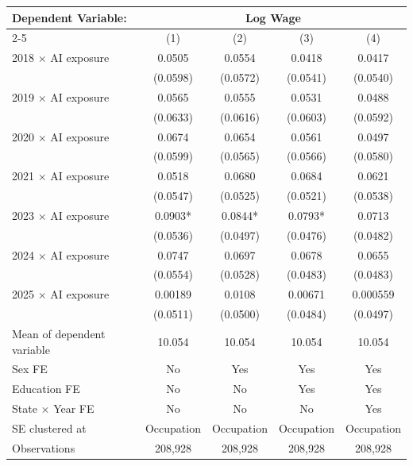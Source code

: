 \def\sym#1{\ifmmode^{#1}\else\(^{#1}\)\fi}
\begin{tabular}{l*{4}{c}}
\toprule
Dependent Variable: & \multicolumn{4}{c}{Log Wage} \\
\cmidrule(lr){2-5}
 & (1) & (2) & (3) & (4) \\
\midrule
2018 $\times$ AI exposure&      0.0505   &      0.0554   &      0.0418   &      0.0417   \\
            &    (0.0598)   &    (0.0572)   &    (0.0541)   &    (0.0540)   \\
2019 $\times$ AI exposure&      0.0565   &      0.0555   &      0.0531   &      0.0488   \\
            &    (0.0633)   &    (0.0616)   &    (0.0603)   &    (0.0592)   \\
2020 $\times$ AI exposure&      0.0674   &      0.0654   &      0.0561   &      0.0497   \\
            &    (0.0599)   &    (0.0565)   &    (0.0566)   &    (0.0580)   \\
2021 $\times$ AI exposure&      0.0518   &      0.0680   &      0.0684   &      0.0621   \\
            &    (0.0547)   &    (0.0525)   &    (0.0521)   &    (0.0538)   \\
2023 $\times$ AI exposure&      0.0903*  &      0.0844*  &      0.0793*  &      0.0713   \\
            &    (0.0536)   &    (0.0497)   &    (0.0476)   &    (0.0482)   \\
2024 $\times$ AI exposure&      0.0747   &      0.0697   &      0.0678   &      0.0655   \\
            &    (0.0554)   &    (0.0528)   &    (0.0483)   &    (0.0483)   \\
2025 $\times$ AI exposure&     0.00189   &      0.0108   &     0.00671   &    0.000559   \\
            &    (0.0511)   &    (0.0500)   &    (0.0484)   &    (0.0497)   \\
\midrule
Mean of dependent variable&      10.054   &      10.054   &      10.054   &      10.054   \\
Sex FE      &          No   &         Yes   &         Yes   &         Yes   \\
Education FE&          No   &          No   &         Yes   &         Yes   \\
State $\times$ Year FE&          No   &          No   &          No   &         Yes   \\
SE clustered at&  Occupation   &  Occupation   &  Occupation   &  Occupation   \\
Observations&     208,928   &     208,928   &     208,928   &     208,928   \\
\bottomrule
\end{tabular}
